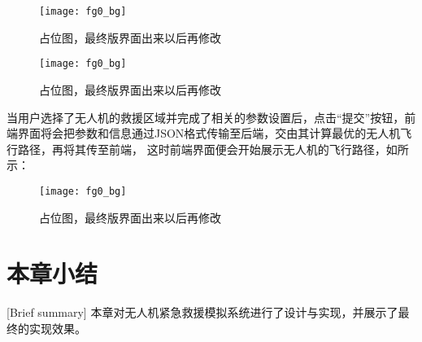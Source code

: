 \begin{figure}[H]
	\centering
	\texttt{[image: fg0\_bg]}
	\caption{占位图，最终版界面出来以后再修改}
	\label{fg603}
\end{figure}
\begin{figure}[H]
	\centering
	\texttt{[image: fg0\_bg]}
	\caption{占位图，最终版界面出来以后再修改}
	\label{fg604}
\end{figure}
当用户选择了无人机的救援区域并完成了相关的参数设置后，点击“提交”按钮，前端界面将会把参数和信息通过JSON格式传输至后端，交由其计算最优的无人机飞行路径，再将其传至前端，
这时前端界面便会开始展示无人机的飞行路径，如所示：
\begin{figure}[H]
	\centering
	\texttt{[image: fg0\_bg]}
	\caption{占位图，最终版界面出来以后再修改}
	\label{fg605}
\end{figure}
\section{本章小结}[Brief summary]
本章对无人机紧急救援模拟系统进行了设计与实现，并展示了最终的实现效果。